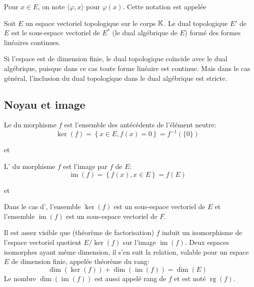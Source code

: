 \medskip
Pour $x \in E$, on note $\langle\varphi,x\rangle$ pour $\varphi(x)$.
Cette notation est appelée 

\medskip
\begin{definition}
Soit $E$ un espace vectoriel topologique sur le corps $\mathbb K$.
Le dual topologique $E'$ de $E$ est le sous-espace vectoriel de $E^*$ (le dual algébrique de $E$)
formé des formes linéaires continues.
\end{definition}
Si l'espace est de dimension finie, le dual topologique coïncide avec le dual algébrique,
puisque dans ce cas toute forme linéaire est continue.
Mais dans le cas général, l'inclusion du dual topologique dans le dual algébrique est stricte.

\medskip
\subsection{Noyau et image}

\begin{definition}[Noyau]
Le  du morphisme $f$  est l'ensemble des antécédents de l'élément neutre:
\begin{equation} \ker(f)=\left\{x\in E, f(x)=0\right\}=f^{-1}(\{0\})\end{equation}
\end{definition}
et 

\medskip
\begin{definition}[Image]
L' du morphisme $f$ est l'image par $f$ de $E$:
\begin{equation} \operatorname{im}(f)=\left\{ f(x), x\in E\right\}=f(E)\end{equation}
\end{definition}
et 

\medskip
Dans le cas d',
l'ensemble $\ker(f)$ est un sous-espace vectoriel de $E$ et
l'ensemble $\operatorname{im}(f)$ est un sous-espace vectoriel de $F$.

\begin{theoreme}
Il est assez visible que (théorème de factorisation) $f$ induit un isomorphisme de
l'espace vectoriel quotient $E/\ker(f)$ sur l'image $\operatorname{im}(f)$.
Deux espaces isomorphes ayant même dimension, il s'en suit la relation,
valable pour un espace $E$ de dimension finie, appelée théorème du rang:
\begin{equation}
    \dim(\ker(f)) + \dim(\operatorname{im}(f)) = \dim( E )
\end{equation}
Le nombre $\dim(\operatorname{im}(f))$ est aussi appelé rang de $f$ et est noté
$\operatorname{rg}(f)$.
\end{theoreme}


